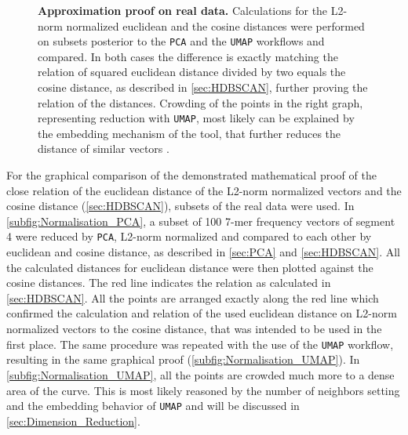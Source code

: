 \begin{figure}[!hbt]
\begin{subfigure}[b]{0.475\textwidth}
    \end{subfigure}
    \caption[Approximation proof on real data]{\textbf{Approximation proof on real data.} Calculations for the L2-norm normalized euclidean and the cosine distances were performed on subsets posterior to the \texttt{PCA} and the \texttt{UMAP} workflows and compared. In both cases the difference is exactly matching the relation of squared euclidean distance divided by two equals the cosine distance, as described in \autoref{sec:HDBSCAN}, further proving the relation of the distances. Crowding of the points in the right graph, representing reduction with \texttt{UMAP}, most likely can be explained by the embedding mechanism of the tool, that further reduces the distance of similar vectors \autocite{mcinnes_umap_2020}.}
    \label{fig:Normalisation_Methods}
\end{figure}

\vspace{1em}

For the graphical comparison of the demonstrated mathematical proof of the close relation of the euclidean distance of the L2-norm normalized vectors and the cosine distance (\autoref{sec:HDBSCAN}), subsets of the real data were used. In \autoref{subfig:Normalisation_PCA}, a subset of 100 7-mer frequency vectors of segment 4 were reduced by \texttt{PCA}, L2-norm normalized and compared to each other by euclidean and cosine distance, as described in \autoref{sec:PCA} and \autoref{sec:HDBSCAN}. All the calculated distances for euclidean distance were then plotted against the cosine distances. The red line indicates the relation as calculated in \autoref{sec:HDBSCAN}. All the points are arranged exactly along the red line which confirmed the calculation and relation of the used euclidean distance on L2-norm normalized vectors to the cosine distance, that was intended to be used in the first place. The same procedure was repeated with the use of the \texttt{UMAP} workflow, resulting in the same graphical proof (\autoref{subfig:Normalisation_UMAP}). In \autoref{subfig:Normalisation_UMAP}, all the points are crowded much more to a dense area of the curve. This is most likely reasoned by the number of neighbors setting and the embedding behavior of \texttt{UMAP} and will be discussed in \autoref{sec:Dimension_Reduction}.











